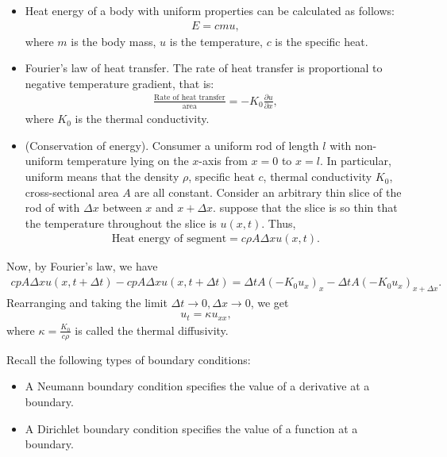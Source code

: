 \documentclass{article}
\begin{document}
\begin{itemize}
  \item Heat energy of a body with uniform properties can be calculated as follows:
    \begin{align*}
      E = c mu,
    \end{align*}
    where $m$ is the body mass, $u$ is the temperature, $c$ is the specific heat.
  \item Fourier's law of heat transfer.  The rate of heat transfer is proportional to negative temperature gradient, that is:
    \begin{align*}
      \frac{\text{Rate of heat transfer}}{\text{area}} = - K_0 \frac{\partial u}{\partial x},
    \end{align*}
    where $K_0$ is the thermal conductivity.
  \item (Conservation of energy).  Consumer a uniform rod of length $l$ with non-uniform temperature lying on the $x$-axis from $x = 0$ to $x = l$.  In particular, uniform means that the density $\rho$, specific heat $c$, thermal conductivity $K_0$, cross-sectional area $A$ are all constant.  Consider an arbitrary thin slice of the rod of with $\Delta x$ between $x$ and $x + \Delta x$.  suppose that the slice is so thin that the temperature throughout the slice is $u(x, t)$.  Thus,
    \begin{align*}
      \text{Heat energy of segment} = c \rho A \Delta x u (x, t).
    \end{align*}
\end{itemize}

Now, by Fourier's law, we have
\begin{align*}
  c p A \Delta x u(x, t + \Delta t) - c p A \Delta x u(x, t + \Delta t) = \Delta t A \left( - K_0 u_x \right)_x - \Delta t A (- K_0 u_x)_{x + \Delta x}.
\end{align*}
Rearranging and taking the limit $\Delta t \to 0, \Delta x \to 0$, we get
\begin{align*}
  u_t = \kappa u_{xx},
\end{align*}
where $\kappa = \frac{K_0}{c \rho}$ is called the thermal diffusivity.

Recall the following types of boundary conditions:

\begin{itemize}
  \item A Neumann boundary condition specifies the value of a derivative at a boundary.
  \item A Dirichlet boundary condition specifies the value of a function at a boundary.
\end{itemize}
\end{document}
